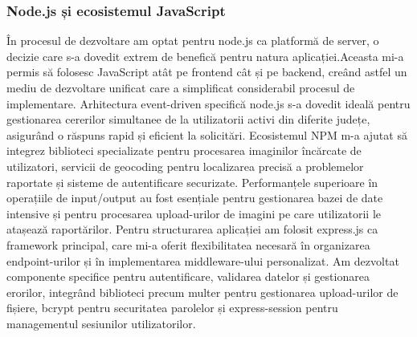 \documentclass[12pt,a4paper]{report}
\begin{document}
\subsubsection{Node.js și ecosistemul JavaScript}
În procesul de dezvoltare am optat pentru node.js ca platformă de server, o decizie care s-a dovedit extrem de benefică pentru natura aplicației.Aceasta mi-a permis să folosesc JavaScript atât pe frontend cât și pe backend, creând astfel un mediu de dezvoltare unificat care a simplificat considerabil procesul de implementare. Arhitectura event-driven specifică node.js s-a dovedit ideală pentru gestionarea cererilor simultanee de la utilizatorii activi din diferite județe, asigurând o răspuns rapid și eficient la solicitări.
Ecosistemul NPM m-a ajutat să integrez biblioteci specializate pentru procesarea imaginilor încărcate de utilizatori, servicii de geocoding pentru localizarea precisă a problemelor raportate și sisteme de autentificare securizate. Performanțele superioare în operațiile de input/output au fost esențiale pentru gestionarea bazei de date intensive și pentru procesarea upload-urilor de imagini pe care utilizatorii le atașează raportărilor.
Pentru structurarea aplicației am folosit express.js ca framework principal, care mi-a oferit flexibilitatea necesară în organizarea endpoint-urilor și în implementarea middleware-ului personalizat. Am dezvoltat componente specifice pentru autentificare, validarea datelor și gestionarea erorilor, integrând biblioteci precum multer pentru gestionarea upload-urilor de fișiere, bcrypt pentru securitatea parolelor și express-session pentru managementul sesiunilor utilizatorilor.
\end{document}
